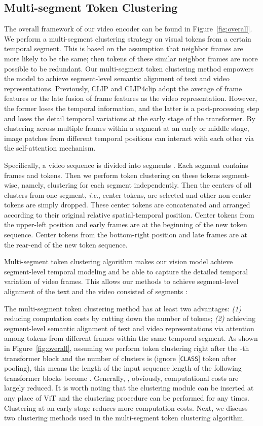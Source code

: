 \documentclass[sigconf]{acmart}
\newcommand{\ie}{\textit{i}.\textit{e}.}
\begin{document}
\subsection{Multi-segment Token Clustering}
The overall framework of our video encoder can be found in Figure~\ref{fig:overall}.
We perform a multi-segment clustering strategy
on visual tokens from a certain temporal segment.
This is based on the assumption that neighbor frames are more
likely to be the same;
then tokens of these similar neighbor frames are more
possible to be redundant.
Our multi-segment token clustering method empowers the model
to achieve segment-level semantic alignment of text and video representations.
Previously, CLIP and CLIP4clip adopt the average of frame features or
the late fusion of frame features as the video representation.
However, the former loses the temporal information,
and the latter is a post-processing step and loses the detail temporal
variations at the early stage of the transformer.
By clustering across multiple frames within a segment
at an early or middle stage,
image patches from different temporal positions can interact with each other
via the self-attention mechanism.

Specifically, a video sequence
 is divided into  segments
.
Each segment contains  frames and  tokens.
Then we perform token clustering on these  tokens segment-wise,
namely, clustering for each segment independently.
Then the centers of all clusters
from one segment,
\ie, center tokens, are selected and
other non-center tokens are simply dropped.
These center tokens are concatenated and arranged according to
their original relative spatial-temporal position.
Center tokens from the upper-left position and early frames are
at the beginning of the new token sequence.
Center tokens from the bottom-right position and late frames are
at the rear-end of the new token sequence.


Multi-segment token clustering algorithm makes our vision model achieve
segment-level temporal modeling and be able to capture the
detailed temporal variation of video frames.
This allows our methods to achieve segment-level alignment of the text 
and the video  consisted of segments :


The multi-segment token clustering method has at least two advantages:
\textit{(1)} reducing computation costs by cutting down the number of tokens;
\textit{(2)} achieving segment-level semantic alignment
of text and video representations via attention among
tokens from different frames within the same temporal segment.
As shown in Figure~\ref{fig:overall}, assuming we perform token clustering
right after the -th transformer block and the number of clusters is 
(ignore [\texttt{CLASS}] token after pooling),
this means the length of the input sequence length of the following 
transformer blocks become .
Generally, , obviously,
computational costs are largely reduced.
It is worth noting that the clustering module can be
inserted at any place of ViT and
the clustering procedure can be performed for any times.
Clustering at an early stage reduces more computation costs.
Next, we discuss two clustering methods used in the
multi-segment token clustering algorithm.
\end{document}
